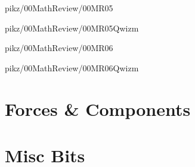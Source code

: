 \documentclass[9pt,xcolor={svgnames, x11names}]{beamer}
\begin{document}

\begin{frame}{pikz/00MathReview/00MR05}
  
\end{frame}


\begin{frame}{pikz/00MathReview/00MR05Qwizm}
  
\end{frame}


\begin{frame}{pikz/00MathReview/00MR06}
  
\end{frame}


\begin{frame}{pikz/00MathReview/00MR06Qwizm}
  
\end{frame}



\section{Forces \& Components}




\section{Misc Bits}
\end{document}

